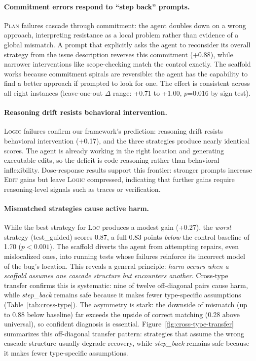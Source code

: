 \documentclass[11pt]{article}
\begin{document}
\paragraph{Commitment errors respond to ``step back'' prompts.}
\textsc{Plan} failures cascade through commitment: the agent doubles down on a wrong approach, interpreting resistance as a local problem rather than evidence of a global mismatch.
A prompt that explicitly asks the agent to reconsider its overall strategy from the issue description reverses this commitment (+0.88), while narrower interventions like scope-checking match the control exactly.
The scaffold works because commitment spirals are reversible: the agent has the capability to find a better approach if prompted to look for one.
The effect is consistent across all eight instances (leave-one-out $\Delta$ range: +0.71 to +1.00, $p$=0.016 by sign test).

\paragraph{Reasoning drift resists behavioral intervention.}
\textsc{Logic} failures confirm our framework's prediction: reasoning drift resists behavioral intervention (+0.17), and the three strategies produce nearly identical scores.
The agent is already working in the right location and generating executable edits, so the deficit is code reasoning rather than behavioral inflexibility.
Dose-response results support this frontier: stronger prompts increase \textsc{Edit} gains but leave \textsc{Logic} compressed, indicating that further gains require reasoning-level signals such as traces or verification.

\paragraph{Mismatched strategies cause active harm.}
While the best strategy for \textsc{Loc} produces a modest gain (+0.27), the \textit{worst} strategy (test\_guided) scores 0.87, a full 0.83 points \textit{below} the control baseline of 1.70 ($p<0.001$).
The scaffold diverts the agent from attempting repairs, even mislocalized ones, into running tests whose failures reinforce its incorrect model of the bug's location.
This reveals a general principle: \textit{harm occurs when a scaffold assumes one cascade structure but encounters another}.
Cross-type transfer confirms this is systematic: nine of twelve off-diagonal pairs cause harm, while \textit{step\_back} remains safe because it makes fewer type-specific assumptions (Table~\ref{tab:cross-type}).
The asymmetry is stark: the downside of mismatch (up to 0.88 below baseline) far exceeds the upside of correct matching (0.28 above universal), so confident diagnosis is essential.
Figure~\ref{fig:cross-type-transfer} summarizes this off-diagonal transfer pattern: strategies that assume the wrong cascade structure usually degrade recovery, while \textit{step\_back} remains safe because it makes fewer type-specific assumptions.
\end{document}
